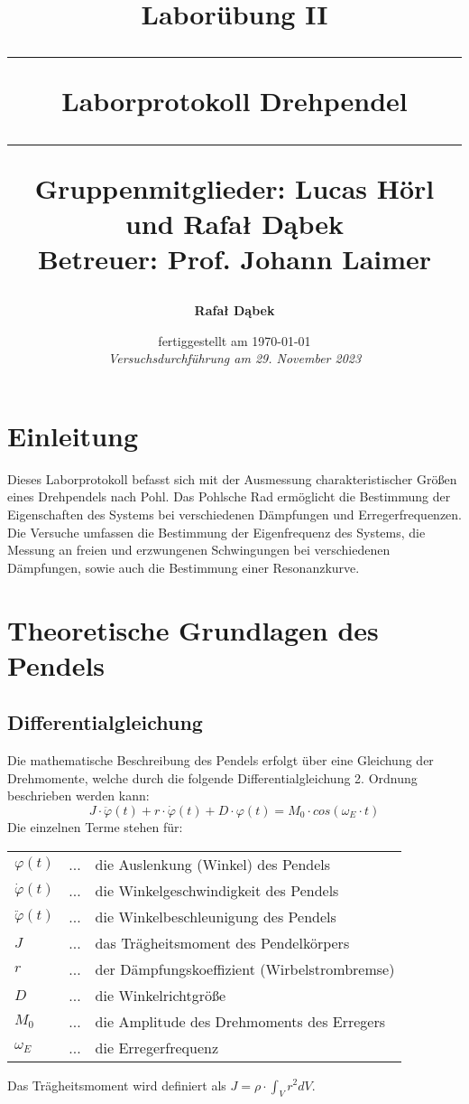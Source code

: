 \documentclass{article}
\title{
    \LARGE \textbf{Laborübung II}
    \vspace{0.5cm}
    \hrule height 2pt
    \vspace{0.5cm}
    \textbf{Laborprotokoll Drehpendel}
    \vspace{0.5cm}
    \hrule height 2pt
    \vspace*{15\baselineskip}
    {
        \small Gruppenmitglieder: Lucas Hörl und Rafał Dąbek
        \\
		Betreuer: Prof. Johann Laimer
    }

}
\author{
    \textbf{Rafał Dąbek}
}
\date{
    fertiggestellt am \today \\
    \textit{Versuchsdurchführung am 29. November 2023}
}
\begin{document}
\maketitle
\clearpage

\tableofcontents
\clearpage

\section{Einleitung}
Dieses Laborprotokoll befasst sich mit der Ausmessung charakteristischer Größen eines Drehpendels nach Pohl. Das Pohlsche Rad
ermöglicht die Bestimmung der Eigenschaften des Systems bei verschiedenen Dämpfungen und Erregerfrequenzen.
Die Versuche umfassen die Bestimmung der Eigenfrequenz des Systems, die Messung an freien und erzwungenen Schwingungen bei verschiedenen Dämpfungen,
sowie auch die Bestimmung einer Resonanzkurve.

\section{Theoretische Grundlagen des Pendels}
\subsection{Differentialgleichung}
Die mathematische Beschreibung des Pendels erfolgt über eine Gleichung der Drehmomente, welche durch die folgende
Differentialgleichung 2. Ordnung beschrieben werden kann:
\begin{equation} \label{eq:pendel}
    J \cdot \ddot \varphi(t) + r \cdot \dot \varphi(t) + D \cdot \varphi(t) = M_{0} \cdot cos(\omega_{E} \cdot t)
\end{equation}
Die einzelnen Terme stehen für:
\begin{flushleft}
\begin{tabular}{lc@{ }l}
    $\varphi(t)$ & ... & die Auslenkung (Winkel) des Pendels\\
    $\dot \varphi(t)$ & ... & die Winkelgeschwindigkeit des Pendels\\
    $\ddot \varphi(t)$ & ... & die Winkelbeschleunigung des Pendels\\
    $J$ & ... & das Trägheitsmoment des Pendelkörpers\\
    $r$ & ... & der Dämpfungskoeffizient (Wirbelstrombremse)\\
    $D$ & ... & die Winkelrichtgröße\\
    $M_{0}$ & ... & die Amplitude des Drehmoments des Erregers\\
    $\omega_{E}$ & ... & die Erregerfrequenz
\end{tabular}
\end{flushleft}
Das Trägheitsmoment wird definiert als $J = \rho \cdot \int_{V}^{} r^{2} dV$.
\cite{w:traegheit}
\end{document}
